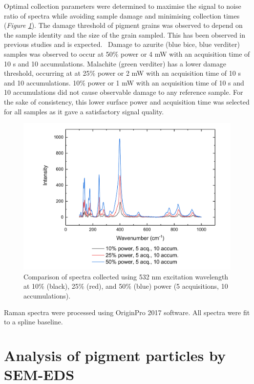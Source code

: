 Optimal collection parameters were determined to maximise the signal to noise ratio of spectra while avoiding sample damage and minimising collection times (\textit{Figure \ref{fig:Az1_laserpower_comp_532}}). The damage threshold of pigment grains was observed to depend on the sample identity and the size of the grain sampled. This has been observed in previous studies and is expected.~\autocite{Cardell,Mattei} Damage to azurite (blue bice, blue verditer) samples was observed to occur at 50\% power or 4 mW with an acquisition time of 10 s and 10 accumulations. Malachite (green verditer) has a lower damage threshold, occurring at at 25\% power or 2 mW with an acquisition time of 10 s and 10 accumulations. 10\% power or 1 mW with an acquisition time of 10 s and 10 accumulations did not cause observable damage to any reference sample. For the sake of consistency, this lower surface power and acquisition time was selected for all samples as it gave a satisfactory signal quality. 

\begin{figure}[H]
\centering
  \includegraphics[width=0.75\linewidth]{Az1_laserpower_comp_532}
\caption[Comparison of spectra collected using 532 nm excitation wavelength at 10\%, 25\%, and 50\% power.]{Comparison of spectra collected using 532 nm excitation wavelength at 10\% (black), 25\% (red), and 50\% (blue) power (5 acquisitions, 10 accumulations).}
\label{fig:Az1_laserpower_comp_532}
\end{figure}

Raman spectra were processed using OriginPro 2017 software. All spectra were fit to a spline baseline. 

\section[Analysis of pigment particles by SEM-EDS]{Analysis of pigment particles by SEM-EDS}
\label{section2.3}

